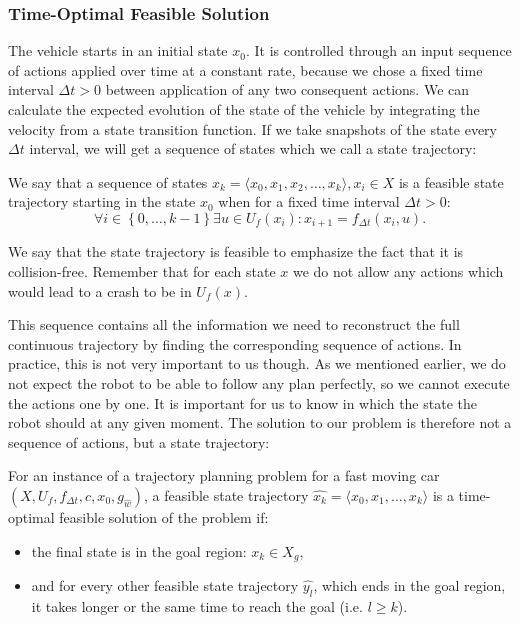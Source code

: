 \subsubsection{Time-Optimal Feasible Solution}

The vehicle starts in an initial state $x_0$. It is controlled through an input sequence of actions applied over time at a constant rate, because we chose a fixed time interval $\Delta t>0$ between application of any two consequent actions. We can calculate the expected evolution of the state of the vehicle by integrating the velocity from a state transition function. If we take snapshots of the state every $\Delta t$ interval, we will get a sequence of states which we call a state trajectory:

\begin{defn}
	We say that a sequence of states $\hat{x_k}=\langle x_0,x_1,x_2,…,x_k \rangle ,x_i\in X$ is a feasible state trajectory starting in the state $x_0$ when for a fixed time interval $\Delta t>0$:
	\[
	\forall i \in \left\{ 0,\ldots,k-1\right\} \exists u\in U_f(x_i): x_{i+1}=f_{\Delta t} (x_i,u).
	\]
\end{defn}

We say that the state trajectory is feasible to emphasize the fact that it is collision-free. Remember that for each state $x$ we do not allow any actions which would lead to a crash to be in $U_f(x)$.

This sequence contains all the information we need to reconstruct the full continuous trajectory by finding the corresponding sequence of actions. In practice, this is not very important to us though. As we mentioned earlier, we do not expect the robot to be able to follow any plan perfectly, so we cannot execute the actions one by one. It is important for us to know in which the state the robot should at any given moment. The solution to our problem is therefore not a sequence of actions, but a state trajectory:

\begin{defn}
	For an instance of a trajectory planning problem for a fast moving car $\left(X, U_f, f_{\Delta t}, c, x_0, g_{\hat{w}}\right)$, a feasible state trajectory $\hat{x_k}=\langle x_0, x_1, \ldots, x_k \rangle$ is a time-optimal feasible solution of the problem if:
	\begin{itemize}
		\item the final state is in the goal region: $x_k \in X_g$,
		\item and for every other feasible state trajectory $\hat{y_l}$, which ends in the goal region, it takes longer or the same time to reach the goal (i.e. $l \geq k$).
	\end{itemize}
\end{defn}

